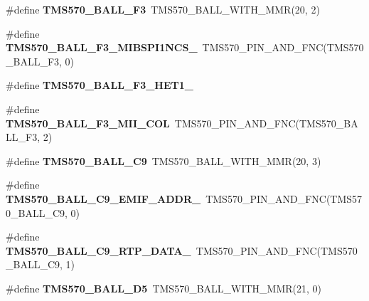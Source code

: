 \begin{DoxyCompactItemize}
\mbox{\label{tms570ls3137zwt-pins_8h_a88da99c7d7fb06c76a228bace1ca6ae8}} 
\#define {\bfseries T\+M\+S570\+\_\+\+B\+A\+L\+L\+\_\+\+F3}~T\+M\+S570\+\_\+\+B\+A\+L\+L\+\_\+\+W\+I\+T\+H\+\_\+\+M\+MR(20, 2)
\item 
\mbox{\label{tms570ls3137zwt-pins_8h_a3e0aefbca64e6854a9e279b2c9936e59}} 
\#define {\bfseries T\+M\+S570\+\_\+\+B\+A\+L\+L\+\_\+\+F3\+\_\+\+M\+I\+B\+S\+P\+I1\+N\+C\+S\+\_}~T\+M\+S570\+\_\+\+P\+I\+N\+\_\+\+A\+N\+D\+\_\+\+F\+NC(T\+M\+S570\+\_\+\+B\+A\+L\+L\+\_\+\+F3, 0)
\item 
\#define {\bfseries T\+M\+S570\+\_\+\+B\+A\+L\+L\+\_\+\+F3\+\_\+\+H\+E\+T1\+\_}
\item 
\mbox{\label{tms570ls3137zwt-pins_8h_a845293ff59333de42a3473e261236b7b}} 
\#define {\bfseries T\+M\+S570\+\_\+\+B\+A\+L\+L\+\_\+\+F3\+\_\+\+M\+I\+I\+\_\+\+C\+OL}~T\+M\+S570\+\_\+\+P\+I\+N\+\_\+\+A\+N\+D\+\_\+\+F\+NC(T\+M\+S570\+\_\+\+B\+A\+L\+L\+\_\+\+F3, 2)
\item 
\mbox{\label{tms570ls3137zwt-pins_8h_a439fad701bbeb55d085572493d9f711e}} 
\#define {\bfseries T\+M\+S570\+\_\+\+B\+A\+L\+L\+\_\+\+C9}~T\+M\+S570\+\_\+\+B\+A\+L\+L\+\_\+\+W\+I\+T\+H\+\_\+\+M\+MR(20, 3)
\item 
\mbox{\label{tms570ls3137zwt-pins_8h_a2c86e0b24ea9f17646dff73db970ebb1}} 
\#define {\bfseries T\+M\+S570\+\_\+\+B\+A\+L\+L\+\_\+\+C9\+\_\+\+E\+M\+I\+F\+\_\+\+A\+D\+D\+R\+\_}~T\+M\+S570\+\_\+\+P\+I\+N\+\_\+\+A\+N\+D\+\_\+\+F\+NC(T\+M\+S570\+\_\+\+B\+A\+L\+L\+\_\+\+C9, 0)
\item 
\mbox{\label{tms570ls3137zwt-pins_8h_a10f27bdb1c42629ceda5c0f5ce21fc63}} 
\#define {\bfseries T\+M\+S570\+\_\+\+B\+A\+L\+L\+\_\+\+C9\+\_\+\+R\+T\+P\+\_\+\+D\+A\+T\+A\+\_}~T\+M\+S570\+\_\+\+P\+I\+N\+\_\+\+A\+N\+D\+\_\+\+F\+NC(T\+M\+S570\+\_\+\+B\+A\+L\+L\+\_\+\+C9, 1)
\item 
\mbox{\label{tms570ls3137zwt-pins_8h_ac384a45677d0a92e215c2062104dd847}} 
\#define {\bfseries T\+M\+S570\+\_\+\+B\+A\+L\+L\+\_\+\+D5}~T\+M\+S570\+\_\+\+B\+A\+L\+L\+\_\+\+W\+I\+T\+H\+\_\+\+M\+MR(21, 0)
\item 

\end{DoxyCompactItemize}
